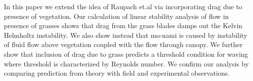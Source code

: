 \documentclass[aps,preprint,floatfix,prl]{revtex4-1}
\begin{document}
\newline 
 In this paper we extend the idea of Raupach et.al via incorporating drag due to presence of vegetation. Our calculation of linear stability analysis of flow in presence of grasses 
shows that drag from the grass blades damps out the Kelvin Helmholtz instability. We also show instead that mo-nami is caused by instability 
of fluid flow above vegetation coupled with the flow through canopy. We further show that inclusion of drag due to grass predicts a threshold condition for waving where threshold is
characterized by Reynolds number. We confirm our analysis by comparing prediction from theory with field and experimental observations.  
\end{document}
